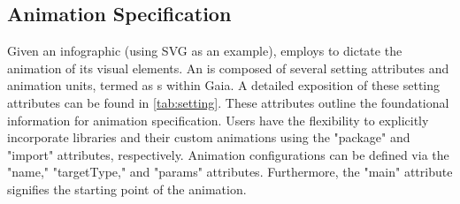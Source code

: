 \subsection{Animation Specification}
\label{ssec:aniclass_aniunit}




Given an infographic (using SVG as an example), \gaia{} employs \aniclass{} to dictate the animation of its visual elements. An \aniclass{} is composed of several setting attributes and animation units, termed as \aniunit{}s within Gaia. A detailed exposition of these setting attributes can be found in \autoref{tab:setting}. 
These attributes outline the foundational information for animation specification. Users have the flexibility to explicitly incorporate libraries and their custom animations using the "package" and "import" attributes, respectively. Animation configurations can be defined via the "name," "targetType," and "params" attributes. Furthermore, the "main" attribute signifies the starting point of the animation.


